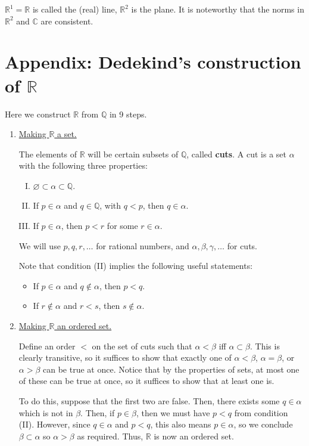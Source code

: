 \documentclass{scrbook}
\newcommand{\Q}{\mathbb{Q}}
\newcommand{\R}{\mathbb{R}}
\newcommand{\C}{\mathbb{C}}
\let\emptyset\varnothing
\renewcommand{\underline}{\ul}
\begin{document}
$\R^1 = \R$ is called the (real) line, $\R^2$ is the plane. It is noteworthy that the norms in $\R^2$ and $\C$ are consistent.

\section{Appendix: Dedekind's construction of $\R$}

Here we construct $\R$ from $\Q$ in 9 steps.

\begin{enumerate}[Step 1.]
\item \underline{Making $\R$ a set.} 

The elements of $\R$ will be certain subsets of $\Q$, called \textbf{cuts}. A cut is a set $\alpha$ with the following three properties:
\begin{enumerate}[(I)]
\item $\emptyset \subset \alpha \subset \Q$.
\item If $p \in \alpha$ and $q \in \Q$, with $q < p$, then $q \in \alpha$.
\item If $p \in \alpha$, then $p < r$ for some $r \in \alpha$.
\end{enumerate}

We will use $p, q, r, \dotsc$ for rational numbers, and $\alpha, \beta, \gamma, \dotsc$ for cuts. 

Note that condition (II) implies the following useful statements:
\begin{itemize}
\item If $p \in \alpha$ and $q \not\in \alpha$, then $p < q$.
\item If $r \not\in \alpha$ and $r < s$, then $s \not\in \alpha$.
\end{itemize}

\item \underline{Making $\R$ an ordered set.} 

Define an order $<$ on the set of cuts such that $\alpha < \beta$ iff $\alpha \subset \beta$. This is clearly transitive, so it suffices to show that exactly one of $\alpha < \beta$, $\alpha = \beta$, or $\alpha > \beta$ can be true at once. Notice that by the properties of sets, at most one of these can be true at once, so it suffices to show that at least one is.

To do this, suppose that the first two are false. Then, there exists some $q \in \alpha$ which is not in $\beta$. Then, if $p \in \beta$, then we must have $p < q$ from condition (II). However, since $q \in \alpha$ and $p < q$, this also means $p \in \alpha$, so we conclude $\beta \subset \alpha$ so $\alpha > \beta$ as required. Thus, $\R$ is now an ordered set.


\end{enumerate}
\end{document}

